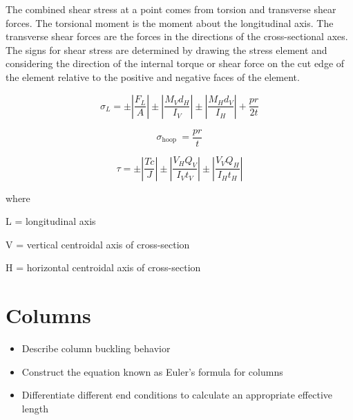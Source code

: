 \documentclass[
  letterpaper,
  DIV=11,
  numbers=noendperiod]{scrreprt}
\providecommand{\tightlist}{%
  \setlength{\itemsep}{0pt}\setlength{\parskip}{0pt}}\usepackage{longtable,booktabs,array}
\begin{document}
\begin{tcolorbox}
The combined shear stress at a point comes from torsion and transverse
shear forces. The torsional moment is the moment about the longitudinal
axis. The transverse shear forces are the forces in the directions of
the cross-sectional axes. The signs for shear stress are determined by
drawing the stress element and considering the direction of the internal
torque or shear force on the cut edge of the element relative to the
positive and negative faces of the element.

\end{tcolorbox}

\begin{tcolorbox}[enhanced jigsaw, breakable, opacityback=0, toptitle=1mm, left=2mm, colback=white, opacitybacktitle=0.6, colframe=quarto-callout-note-color-frame, titlerule=0mm, arc=.35mm, leftrule=.75mm, bottomtitle=1mm, colbacktitle=quarto-callout-note-color!10!white, rightrule=.15mm, title={Key equations}, bottomrule=.15mm, toprule=.15mm, coltitle=black]

\[
\sigma_L= \pm\left|\frac{F_L}{A}\right| \pm\left|\frac{M_V d_H}{I_V}\right| \pm\left|\frac{M_H d_V}{I_H}\right|+\frac{p r}{2 t}
\]

\[
\sigma_{\text {hoop }}=\frac{p r}{t}
\]

\[
\tau= \pm\left|\frac{T c}{J}\right| \pm\left|\frac{V_H Q_V}{I_V t_V}\right| \pm\left|\frac{V_V Q_H}{I_H t_H}\right|
\]

where

L = longitudinal axis

V = vertical centroidal axis of cross-section

H = horizontal centroidal axis of cross-section

\end{tcolorbox}


\chapter{Columns}\label{sec-columns}

\begin{tcolorbox}[enhanced jigsaw, breakable, opacityback=0, toptitle=1mm, left=2mm, colback=white, opacitybacktitle=0.6, colframe=quarto-callout-note-color-frame, titlerule=0mm, arc=.35mm, leftrule=.75mm, bottomtitle=1mm, colbacktitle=quarto-callout-note-color!10!white, rightrule=.15mm, title={Learning Objectives}, bottomrule=.15mm, toprule=.15mm, coltitle=black]

\begin{itemize}
\tightlist
\item
  Describe column buckling behavior
\item
  Construct the equation known as Euler's formula for columns
\item
  Differentiate different end conditions to calculate an appropriate
  effective length
\end{itemize}

\end{tcolorbox}
\end{document}
